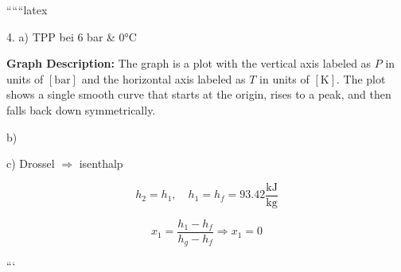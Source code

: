 
``````latex


4. a) TPP bei 6 bar \& 0°C

\textbf{Graph Description:} 
The graph is a plot with the vertical axis labeled as \( P \) in units of \([ \text{bar} ]\) and the horizontal axis labeled as \( T \) in units of \([ \text{K} ]\). The plot shows a single smooth curve that starts at the origin, rises to a peak, and then falls back down symmetrically.

b)

c) Drossel \(\Rightarrow\) isenthalp

\[
h_2 = h_1, \quad h_1 = h_f = 93.42 \frac{\text{kJ}}{\text{kg}}
\]

\[
x_1 = \frac{h_1 - h_f}{h_g - h_f} \Rightarrow x_1 = 0
\]

```
